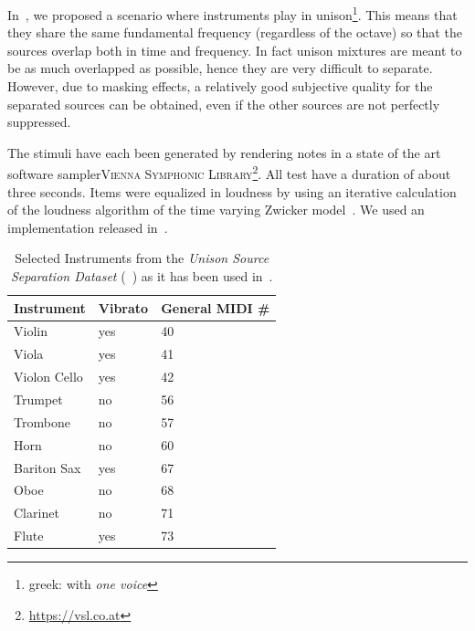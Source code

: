 
In~\cite{stoeter14}, we proposed a scenario where instruments play in unison\footnote{greek: with \emph{one voice}}. 
This means that they share the same fundamental frequency (regardless of the octave) so that the sources overlap both in time and frequency. 
In fact unison mixtures are meant to be as much overlapped as possible, hence they are very difficult to separate. However, due to masking effects, a relatively good subjective quality for the separated sources can be obtained, even if the other sources are not perfectly suppressed.



\par
The stimuli have each been generated by rendering notes in a state of the art software sampler\textsc{Vienna Symphonic Library}\footnote{\url{https://vsl.co.at}}. All test have a duration of about three seconds. Items were equalized in loudness by using an iterative calculation of the loudness algorithm of the time varying Zwicker model~\cite{zwicker13}. 
We used an implementation released in~\cite{genesis12}. 

\begin{table}
\begin{center}
\footnotesize
\begin{tabular}{ l l l}
  Instrument & Vibrato &  General MIDI \# \\
  \hline
  Violin & yes & 40 \\
  Viola & yes & 41 \\
  Violon Cello & yes & 42 \\
  Trumpet & no & 56 \\
  Trombone & no & 57\\
  Horn & no & 60  \\
  Bariton Sax & yes & 67 \\
  Oboe & no & 68\\
  Clarinet & no & 71\\
  Flute & yes & 73\\
\end{tabular}
\end{center}
\caption{Selected Instruments from the \emph{Unison Source Separation Dataset} (~\cite{oss_unison}) as it has been used in~\cite{stoeter14, stoeter16}.}
\label{tab:testset}
\end{table}

